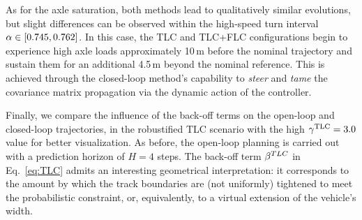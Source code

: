As for the axle saturation, both methods lead to qualitatively similar evolutions, but slight differences can be observed within the high-speed turn interval $\alpha \in [0.745, 0.762]$. In this case, the TLC and TLC+FLC configurations begin to experience high axle loads approximately 10\,m before the nominal trajectory and sustain them for an additional 4.5\,m beyond the nominal reference. This is achieved through the closed-loop method's capability to \emph{steer} and \emph{tame} the covariance matrix propagation via the dynamic action of the controller.

Finally, we compare the influence of the back-off terms on the open-loop and closed-loop trajectories, in the robustified TLC scenario with the high $\gamma^\textrm{TLC}=3.0$ value for better visualization. As before, the open-loop planning is carried out with a prediction horizon of $H=4$ steps.
The back-off term $\beta^{TLC}$ in Eq.~\eqref{eq:TLC} admits an interesting geometrical interpretation: it corresponds to the amount by which the track boundaries are (not uniformly) tightened to meet the probabilistic constraint, or, equivalently, to a virtual extension of the vehicle's width.

